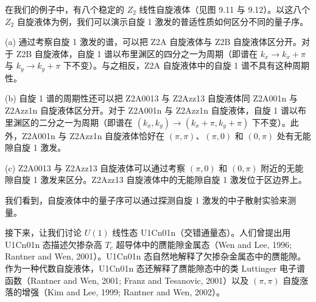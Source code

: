 在我们的例子中，有八个稳定的 $Z_2$ 线性自旋液体（见图 9.11 与 9.12）。以这八个 $Z_2$ 自旋液体为例，我们可以演示自旋 1 激发的普适性质如何区分不同的量子序。


(a) 通过考察自旋 1 激发的谱，可以把 Z2A 自旋液体与 Z2B 自旋液体区分开。对于 Z2B 自旋液体，自旋 1 谱以布里渊区的四分之一为周期（即谱在 $k_x\to k_x+\pi$ 与 $k_y\to k_y+\pi$ 下不变）。与之相反，Z2A 自旋液体中的自旋 1 谱不具有这种周期性。

(b) 自旋 1 谱的周期性还可以把 Z2A0013 与 Z2Azz13 自旋液体同 Z2A001n 与 Z2Azz1n 自旋液体区分开。对于 Z2A001n 与 Z2Azz1n 自旋液体，自旋 1 谱以布里渊区的二分之一为周期（即谱在 $(k_x,k_y)\to(k_x+\pi,k_y+\pi)$ 下不变）。此外，Z2A001n 与 Z2Azz1n 自旋液体恰好在 $(\pi,\pi)$、$(\pi,0)$ 和 $(0,\pi)$ 处有无能隙自旋 1 激发。

(c) Z2A0013 与 Z2Azz13 自旋液体可以通过考察 $(\pi,0)$ 和 $(0,\pi)$ 附近的无能隙自旋 1 激发来区分。Z2Azz13 自旋液体中的无能隙自旋 1 激发位于区边界上。


我们看到，自旋液体中的量子序可以通过探测自旋 1 激发的中子散射实验来测量。

接下来，让我们讨论 $U(1)$ 线性态 U1Cn01n（交错通量态）。人们曾提出用 U1Cn01n 态描述欠掺杂高 $T_c$ 超导体中的赝能隙金属态（Wen and Lee, 1996; Rantner and Wen, 2001）。U1Cn01n 态自然地解释了欠掺杂金属态中的赝能隙。作为一种代数自旋液体，U1Cn01n 态还解释了赝能隙态中的类 Luttinger 电子谱函数（Rantner and Wen, 2001; Franz and Tesanovic, 2001）以及 $(\pi,\pi)$ 自旋涨落的增强（Kim and Lee, 1999; Rantner and Wen, 2002）。



